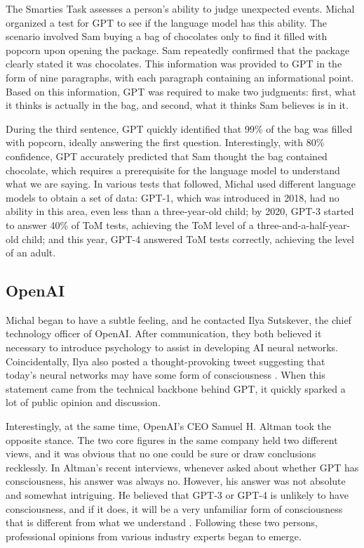 \documentclass[10pt,journal,compsoc]{IEEEtran}
\begin{document}
The Smarties Task assesses a person's ability to judge unexpected events. Michal organized a test for GPT to see if the language model has this ability. The scenario involved Sam buying a bag of chocolates only to find it filled with popcorn upon opening the package. Sam repeatedly confirmed that the package clearly stated it was chocolates. This information was provided to GPT in the form of nine paragraphs, with each paragraph containing an informational point. Based on this information, GPT was required to make two judgments: first, what it thinks is actually in the bag, and second, what it thinks Sam believes is in it. \cite{心智}

During the third sentence, GPT quickly identified that 99\% of the bag was filled with popcorn, ideally answering the first question. Interestingly, with 80\% confidence, GPT accurately predicted that Sam thought the bag contained chocolate, which requires a prerequisite for the language model to understand what we are saying. In various tests that followed, Michal used different language models to obtain a set of data: GPT-1, which was introduced in 2018, had no ability in this area, even less than a three-year-old child; by 2020, GPT-3 started to answer 40\% of ToM tests, achieving the ToM level of a three-and-a-half-year-old child; and this year, GPT-4 answered ToM tests correctly, achieving the level of an adult. \cite{心智}


\subsection{OpenAI}

Michal began to have a subtle feeling, and he contacted Ilya Sutskever, the chief technology officer of OpenAI. After communication, they both believed it necessary to introduce psychology to assist in developing AI neural networks. Coincidentally, Ilya also posted a thought-provoking tweet suggesting that today's neural networks may have some form of consciousness \cite{或许存在}. When this statement came from the technical backbone behind GPT, it quickly sparked a lot of public opinion and discussion.

Interestingly, at the same time, OpenAI's CEO Samuel H. Altman took the opposite stance. The two core figures in the same company held two different views, and it was obvious that no one could be sure or draw conclusions recklessly. In Altman's recent interviews, whenever asked about whether GPT has consciousness, his answer was always no. However, his answer was not absolute and somewhat intriguing. He believed that GPT-3 or GPT-4 is unlikely to have consciousness, and if it does, it will be a very unfamiliar form of consciousness that is different from what we understand \cite{没有}. Following these two persons, professional opinions from various industry experts began to emerge.
\end{document}
